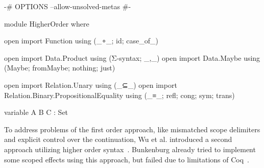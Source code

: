 \begin{code}[hide]
{-# OPTIONS --allow-unsolved-metas #-}

module HigherOrder where

open import Function using (_∘_; id; case_of_)

open import Data.Product using (Σ-syntax; _,_)
open import Data.Maybe using (Maybe; fromMaybe; nothing; just)

open import Relation.Unary using (_⊆_)
open import Relation.Binary.PropositionalEquality using (_≡_; refl; cong; sym; trans)

variable
  A B C : Set
\end{code}


To address problems of the first order approach, like mismatched scope
delimiters and explicit control over the continuation, Wu et al. introduced a
second approach utilizing higher order syntax~\cite{DBLP:conf/haskell/WuSH14}.
Bunkenburg already tried to implement some scoped effects using this approach,
but failed due to limitations of Coq~\cite{bunkenburg2019modeling}.


